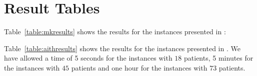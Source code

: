 \documentclass[a4paper,11pt,authoryear]{elsarticle}
\begin{document}
% 
% 

% 




%


\newpage



\appendix




\section{Result Tables}
\label{appendix:resulttables}

\noindent Table~\ref{table:mkresults} shows the results for the instances presented in \cite{mankowska2014}:


\noindent Table~\ref{table:aithresults} shows the results for the instances presented in \cite{aithaddadene2016}. We have allowed a time of 5 seconds for the instances with $18$ patients, 5 minutes for the instances with $45$ patients and one hour for the instances with $73$ patients.



\end{document}
